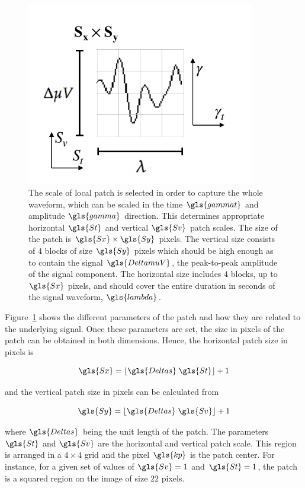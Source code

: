 \begin{figure}[h!]
\centering
\includegraphics[width=10cm]{images/patchgeometry.pdf}
\caption[Patch Geometry]{The scale of local patch is selected in order to capture the whole waveform, which can be scaled in the time $\gls{gammat}$ and amplitude $\gls{gamma}$ direction.  This determines appropriate horizontal $\gls{St}$ and vertical $\gls{Sv}$ patch scales.  The size of the patch is $\gls{Sx} \times \gls{Sy}$ pixels. The vertical size consists of $4$ blocks of size $\gls{Sy}$ pixels which should be high enough as to contain the signal $\gls{DeltamuV}$, the peak-to-peak amplitude of the signal component. The horizontal size includes $4$ blocks, up to $\gls{Sx}$ pixels, and should cover the entire duration in seconds of the signal waveform, $\gls{lambda}$.   }
\label{fig:patchgeometry}
\end{figure}

Figure~\ref{fig:patchgeometry} shows the different parameters of the patch and how they are related to the underlying signal. Once these parameters are set, the size in pixels of the patch can be obtained in both dimensions.  Hence, the horizontal patch size in pixels is

\begin{equation}
\gls{Sx} = \lfloor \gls{Deltas} \; \gls{St} \rfloor + 1
\label{eq:sx}
\end{equation}

\noindent and the vertical patch size in pixels can be calculated from

\begin{equation}
\gls{Sy} = \lfloor \gls{Deltas} \; \gls{Sv} \rfloor + 1
\label{eq:sy}
\end{equation}

\noindent where $\gls{Deltas}$ being the unit length of the patch. The parameters $\gls{St}$  and $\gls{Sv}$ are the horizontal and vertical patch scale. This region is arranged in a $4 \times 4$ grid and the pixel $\gls{kp}$ is the patch center.   For instance, for a given set of values of $\gls{Sv} = 1$ and $\gls{St} = 1$, the patch is a squared region on the image of size $22$ pixels.


